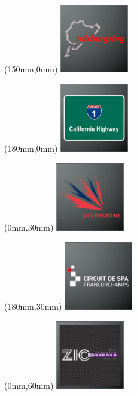 \begin{textblock*}{30mm}(150mm,0mm)%
\includegraphics[width=30mm]{LG/2015-05-20_00089.png}
\end{textblock*}
\begin{textblock*}{30mm}(180mm,0mm)%
\includegraphics[width=30mm]{LG/2015-05-20_00077.png}
\end{textblock*}
\begin{textblock*}{30mm}(0mm,30mm)%
\includegraphics[width=30mm]{LG/2015-05-20_00094.png}
\end{textblock*}
\begin{textblock*}{30mm}(180mm,30mm)%
\includegraphics[width=30mm]{LG/2015-05-20_00079.png}
\end{textblock*}
\begin{textblock*}{30mm}(0mm,60mm)%
\includegraphics[width=30mm]{LG/2015-05-20_00099.png}
\end{textblock*}
